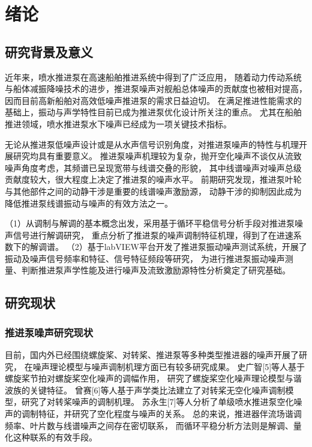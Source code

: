 \chapter{绪论}

\section{研究背景及意义}

近年来，喷水推进泵在高速船舶推进系统中得到了广泛应用，
随着动力传动系统与船体减振降噪技术的进步，推进泵噪声对舰船总体噪声的贡献度也被相对提高，
因而目前高新船舶对高效低噪声推进泵的需求日益迫切。
在满足推进性能需求的基础上，振动与声学特性目前已成为推进泵优化设计所关注的重点。
尤其在船舶推进领域，喷水推进泵水下噪声已经成为一项关键技术指标。

无论从推进泵低噪声设计或是从水声信号识别角度，对推进泵噪声的特性与机理开展研究均具有重要意义。
推进泵噪声机理较为复杂，抛开空化噪声不谈仅从流致噪声角度考虑，其频谱已呈现宽带与线谱交叠的形貌，
其中线谱噪声对噪声总级贡献度较大，很大程度上决定了推进泵的噪声水平。
前期研究发现，推进泵叶轮与其他部件之间的动静干涉是重要的线谱噪声激励源，
动静干涉的抑制因此成为降低推进泵线谱振动与噪声的有效方法之一。

（1）从调制与解调的基本概念出发，采用基于循环平稳信号分析手段对推进泵噪声信号进行解调研究，
重点分析了推进泵的噪声调制特征机理，得到了在进速系数下的解调谱。
（2）基于labVIEW平台开发了推进泵振动噪声测试系统，开展了振动及噪声信号频率和特征、信号特征频段等研究，
为进行推进泵振动噪声测量、判断推进泵声学性能及进行噪声及流致激励源特性分析奠定了研究基础。 


\section{研究现状}
\subsection{推进泵噪声研究现状}
目前，国内外已经围绕螺旋桨、对转桨、推进泵等多种类型推进器的噪声开展了研究，
在噪声理论模型与噪声调制机理方面已有较多研究成果。
史广智[5]等人基于螺旋桨节拍对螺旋桨空化噪声的调幅作用，
研究了螺旋桨空化噪声理论模型与谐波族的关键特征。
曾赛[6]等人基于声学类比法建立了对转桨无空化噪声调制模型，研究了对转桨噪声的调制机理。
苏永生[7]等人分析了单级喷水推进泵空化噪声的调制特征，并研究了空化程度与噪声的关系。
总的来说，推进器伴流场谐调频率、叶片数与线谱噪声之间存在密切联系，
而循环平稳分析方法则是解调、量化这种联系的有效手段。

